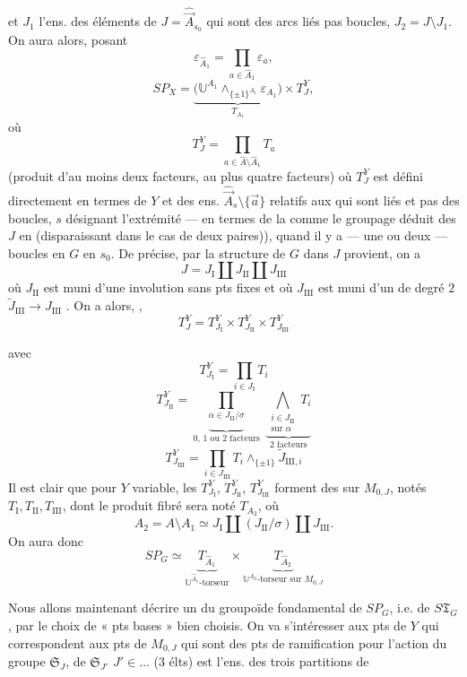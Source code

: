 \documentclass[11pt,a4paper]{article}
\begin{document}
et $J_1$ l'ens. des éléments de $J = \hat{\vec{A}}_{s_0}$ qui sont
\struck{\ill{}} des arcs liés pas boucles, $J_2 = J \setminus J_1$. On aura
alors, posant
\[
\varepsilon_{\hat{A}_1} = \prod_{a \in \hat{A}_1} \varepsilon_a ,
\]
\[
SP_X = \underbrace{\bigl( \mathbb{U}^{A_1} \wedge_{\{\pm 1\}^{A_1}} \varepsilon_{A_1} \bigr)}_{T_{A_1}} \times T^{Y}_{J} ,
\]
où
\[
T^{Y}_{J} = \prod_{a \in \hat{A} \setminus \hat{A}_1} T_a
\]
(produit d'au moins deux facteurs, au plus quatre facteurs)
où $T^{Y}_{J}$ est défini directement \add{\ill{}} en termes de $Y$ et des
ens. $\hat{\vec{A}}_s \setminus \{\vec{a}\}$ relatifs aux 
 qui sont liés et pas des boucles,
$s$ désignant l'extrémité 
\ill{} —  en termes de la  \ill{} comme
le groupage déduit des $J$ en  (disparaissant dans le cas de deux
paires)), quand il y a — une ou deux — boucles en $G$ en $s_0$. De
 précise, par la structure de $G$ dans $J$ provient, on a
\[
J = J_{\mathrm{I}} \amalg J_{\mathrm{II}} \amalg J_{\mathrm{III}}
\]
où $J_{\mathrm{II}}$ est muni d'une involution sans pts fixes \add{$\sigma$}
et où $J_{\mathrm{III}}$ est muni d'un  de degré $2$
$\tilde{J}_{\mathrm{III}} \to J_{\mathrm{III}}$ . On a alors, \ill{},
\[
T^{Y}_{J} = T^{Y}_{J_{\mathrm{I}}} \times T^{Y}_{J_{\mathrm{II}}} \times T^{Y}_{J_{\mathrm{III}}}
\]

avec
\[
T^{Y}_{J_{\mathrm{I}}} = \prod_{i \in J_{\mathrm{I}}} T_i
\]
\[
T^{Y}_{J_{\mathrm{II}}} =
\underbrace{\prod_{\alpha \in J_{\mathrm{II}}/\sigma}}_{0,\,1 \text{ ou } 2 \text{ facteurs}}
\;
\underbrace{\bigwedge_{\substack{i \in J_{\mathrm{II}} \\ \text{sur } \alpha}} T_i}_{2 \text{ facteurs}}
\]
\[
T^{Y}_{J_{\mathrm{III}}} = \prod_{i \in J_{\mathrm{III}}} T_i \wedge_{\{\pm 1\}} \tilde{J}_{\mathrm{III},i}
\]
Il est clair que pour $Y$ variable, les $T^{Y}_{J_{\mathrm{I}}}$,
$T^{Y}_{J_{\mathrm{II}}}$, $T^{Y}_{J_{\mathrm{III}}}$ forment des
  sur $M_{0,J}$, notés
$T_{\mathrm{I}}, T_{\mathrm{II}}, T_{\mathrm{III}}$, dont le produit fibré sera
noté $T_{A_2}$, où
\[
A_2 = A \setminus A_1 \simeq J_{\mathrm{I}} \amalg (J_{\mathrm{II}}/\sigma) \amalg J_{\mathrm{III}} .
\]
On aura donc
\[
SP_G \simeq
\underbrace{T_{\hat{A}_1}}_{\text{$\mathbb{U}^{\hat{A}_1}$-torseur}}
\times
\underbrace{T_{\hat{A}_2}}_{\text{$\mathbb{U}^{A_2}$-torseur sur $M_{0,J}$}}
\]

Nous allons maintenant décrire un \ill{} du groupoïde fondamental de $SP_G$,
i.e. de $S\mathfrak{T}_G$, par le choix de « pts bases » bien choisis. On va
s'intéresser aux  pts de  $Y$ qui correspondent
aux pts de $M_{0,J}$ qui sont des pts de ramification pour l'action du groupe
 $\mathfrak{S}_J$, de $\mathfrak{S}_{J'}$ 
$J' \in \ldots$ ($3$ élts) est l'ens. des trois partitions de
\end{document}
